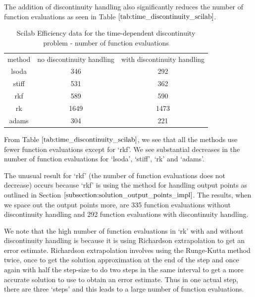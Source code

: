 The addition of discontinuity handling also significantly reduces the number of function evaluations as seen in Table $\ref{tab:time_discontinuity_scilab}$.

\begin{table}[H]
\caption {Scilab Efficiency data for the time-dependent discontinuity problem - number of function evaluations} 
\label{tab:time_discontinuity_scilab} 
\begin{center}
\begin{tabular}{ c c c }
method & no discontinuity handling & with discontinuity handling \\ 
lsoda & 346 & 292 \\
stiff & 531 & 362 \\
rkf & 589 & 590 \\
rk & 1649 & 1473 \\
adams & 304 & 221 \\
\end{tabular}
\end{center}
\end{table}

From Table $\ref{tab:time_discontinuity_scilab}$, we see that all the methods use fewer function evaluations except for `rkf'. We see substantial decreases in the number of function evaluations for `lsoda', `stiff', `rk' and `adams'.

The unusual result for `rkf' (the number of function evaluations does not decrease) occurs because `rkf' is using the method for handling output points as outlined in Section $\ref{subsection:solution_output_points_impl}$. The results, when we space out the output points more, are 335 function evaluations without discontinuity handling and 292 function evaluations with discontinuity handling.

We note that the high number of function evaluations in `rk' with and without discontinuity handling is because it is using Richardson extrapolation \cite{MR1261869} to get an error estimate. Richardson extrapolation involves using the Runge-Kutta method twice, once to get the solution approximation at the end of the step and once again with half the step-size to do two steps in the same interval to get a more accurate solution to use to obtain an error estimate. Thus in one actual step, there are three `steps' and this leads to a large number of function evaluations.

